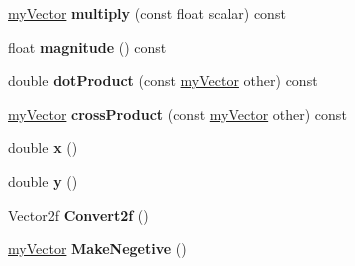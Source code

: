 \begin{DoxyCompactItemize}
\item 
\hypertarget{classmy_vector_a9465f76761927752eea5a66664443500}{}\hyperlink{classmy_vector}{my\+Vector} {\bfseries multiply} (const float scalar) const \label{classmy_vector_a9465f76761927752eea5a66664443500}

\item 
\hypertarget{classmy_vector_a69838d6c85759fa2a2c82ea42f13b989}{}float {\bfseries magnitude} () const \label{classmy_vector_a69838d6c85759fa2a2c82ea42f13b989}

\item 
\hypertarget{classmy_vector_af43d29d51639072515cad23ef7415786}{}double {\bfseries dot\+Product} (const \hyperlink{classmy_vector}{my\+Vector} other) const \label{classmy_vector_af43d29d51639072515cad23ef7415786}

\item 
\hypertarget{classmy_vector_af05be0fcb82238606e624b97eef10990}{}\hyperlink{classmy_vector}{my\+Vector} {\bfseries cross\+Product} (const \hyperlink{classmy_vector}{my\+Vector} other) const \label{classmy_vector_af05be0fcb82238606e624b97eef10990}

\item 
\hypertarget{classmy_vector_a240764ad5e79de7a6ce9e950bc531682}{}double {\bfseries x} ()\label{classmy_vector_a240764ad5e79de7a6ce9e950bc531682}

\item 
\hypertarget{classmy_vector_a940c23ee317384a6fd3b4588986ad3cb}{}double {\bfseries y} ()\label{classmy_vector_a940c23ee317384a6fd3b4588986ad3cb}

\item 
\hypertarget{classmy_vector_a2a99754a40661435447dd17138e8f63a}{}Vector2f {\bfseries Convert2f} ()\label{classmy_vector_a2a99754a40661435447dd17138e8f63a}

\item 
\hypertarget{classmy_vector_a6d039a25169b58a8164f8f979d8b315b}{}\hyperlink{classmy_vector}{my\+Vector} {\bfseries Make\+Negetive} ()\label{classmy_vector_a6d039a25169b58a8164f8f979d8b315b}

\end{DoxyCompactItemize}
